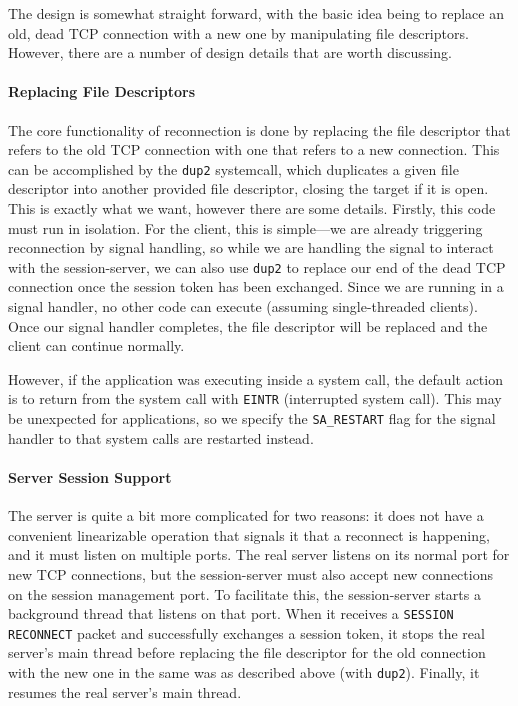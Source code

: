\documentclass[twocolumn,11pt]{article}
\begin{document}
The design is somewhat straight forward, with the basic idea being to replace an
old, dead TCP connection with a new one by manipulating file descriptors.
However, there are a number of design details that are worth discussing.

\paragraph{Replacing File Descriptors}
The core functionality of reconnection is done by replacing the file descriptor
that refers to the old TCP connection with one that refers to a new connection.
This can be accomplished by the \texttt{dup2} systemcall, which duplicates a
given file descriptor into another provided file descriptor, closing the target
if it is open. This is exactly what we want, however there are some details.
Firstly, this code must run in isolation. For the client, this is simple---we
are already triggering reconnection by signal handling, so while we are handling
the signal to interact with the session-server, we can also use \texttt{dup2} to
replace our end of the dead TCP connection once the session token has been
exchanged. Since we are running in a signal handler, no other code can execute
(assuming single-threaded clients). Once our signal handler completes, the file
descriptor will be replaced and the client can continue normally.

However, if the application was executing inside a system call, the default
action is to return from the system call with \texttt{EINTR} (interrupted system
call). This may be unexpected for applications, so we specify the
\texttt{SA\_RESTART} flag for the signal handler to that system calls are
restarted instead.


\paragraph{Server Session Support}
The server is quite a bit more complicated for two reasons: it does not have a
convenient linearizable operation that signals it that a reconnect is happening,
and it must listen on multiple ports. The real server listens on its normal port
for new TCP connections, but the session-server must also accept new connections
on the session management port. To facilitate this, the session-server starts a
background thread that listens on that port. When it receives a \texttt{SESSION
RECONNECT} packet and successfully exchanges a session token, it stops the real
server's main thread before replacing the file descriptor for the old connection
with the new one in the same was as described above (with \texttt{dup2}).
Finally, it resumes the real server's main thread.
\end{document}

